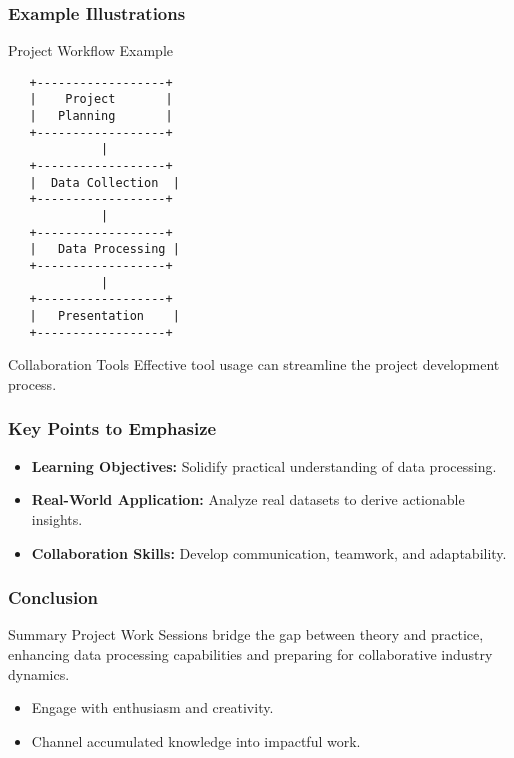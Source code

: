 \documentclass[aspectratio=169]{beamer}
\begin{document}
\begin{frame}[fragile]
    \frametitle{Example Illustrations}
    \begin{block}{Project Workflow Example}
        \begin{center}
            \begin{verbatim}
   +------------------+
   |    Project       |
   |   Planning       |
   +------------------+
             |
   +------------------+
   |  Data Collection  |
   +------------------+
             |
   +------------------+
   |   Data Processing |
   +------------------+
             |
   +------------------+
   |   Presentation    |
   +------------------+
            \end{verbatim}
        \end{center}
    \end{block}
    
    \begin{block}{Collaboration Tools}
        Effective tool usage can streamline the project development process.
    \end{block}
\end{frame}

\begin{frame}[fragile]
    \frametitle{Key Points to Emphasize}
    \begin{itemize}
        \item \textbf{Learning Objectives:} Solidify practical understanding of data processing.
        \item \textbf{Real-World Application:} Analyze real datasets to derive actionable insights.
        \item \textbf{Collaboration Skills:} Develop communication, teamwork, and adaptability.
    \end{itemize}
\end{frame}

\begin{frame}[fragile]
    \frametitle{Conclusion}
    \begin{block}{Summary}
        Project Work Sessions bridge the gap between theory and practice, enhancing data processing capabilities and preparing for collaborative industry dynamics.
    \end{block}
    \begin{itemize}
        \item Engage with enthusiasm and creativity.
        \item Channel accumulated knowledge into impactful work.
    \end{itemize}
\end{frame}
\end{document}
